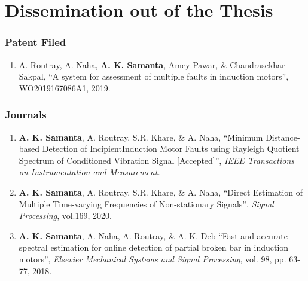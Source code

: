 \chapter*{Dissemination out of the Thesis}

\subsection*{Patent Filed}
\begin{enumerate}
	\item{A. Routray, A. Naha, \textbf{A. K. Samanta}, Amey Pawar, \& Chandrasekhar Sakpal, “A system for assessment of multiple faults in induction motors”, WO2019167086A1, 2019.}
\end{enumerate}

\subsection*{Journals}
\begin{enumerate}
	\item{\textbf{A. K. Samanta}, A. Routray, S.R. Khare, \& A. Naha, “Minimum Distance-based Detection of IncipientInduction Motor Faults using Rayleigh Quotient Spectrum of Conditioned Vibration Signal [Accepted]”, \textit{IEEE Transactions on Instrumentation and Measurement.}}
	\item{\textbf{A. K. Samanta}, A. Routray, S.R. Khare, \& A. Naha, “Direct Estimation of Multiple Time-varying Frequencies of Non-stationary Signals”, \textit{Signal Processing}, vol.169, 2020.}
	\item{\textbf{A. K. Samanta}, A. Naha, A. Routray, \& A. K. Deb “Fast and accurate spectral estimation for online detection of partial broken bar in induction motors”, \textit{Elsevier Mechanical Systems and Signal Processing}, vol. 98, pp. 63-77, 2018.}
\end{enumerate}